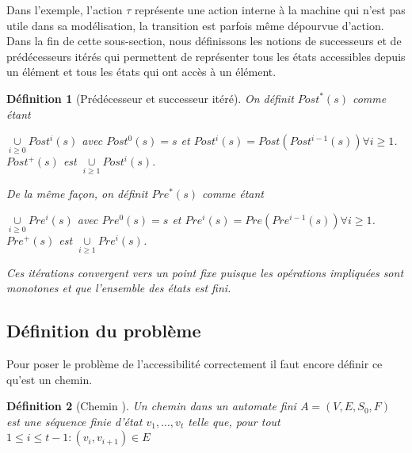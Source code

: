 \documentclass[12pt,a4paper,oneside]{book}
\theoremstyle{break}
\newtheorem{defin}{Définition}[chapter]
\theoremstyle{breakplain}
\begin{document}
Dans l'exemple, l'action $\tau$ représente une action interne à la machine qui n'est pas utile dans sa modélisation, la transition est parfois même dépourvue d'action.\\

Dans la fin de cette sous-section, nous définissons les notions de successeurs et de prédécesseurs itérés qui permettent de représenter tous les états accessibles depuis un élément et tous les états qui ont accès à un élément.


\begin{defin}[Prédécesseur et successeur itéré\cite{baier2008principles}]
On définit $Post^*(s)$ comme étant 
\begin{center}$\underset{i \geq 0}{\cup} Post^i(s)$ avec $Post^0(s) = s$ et $Post^i(s) = Post(Post^{i-1}(s)) \forall i \geq 1$.\\
$Post^+(s)$ est $\underset{i \geq 1}{\cup} Post^i(s)$.
\end{center}
De la même façon, on définit $Pre^*(s)$ comme étant
\begin{center}
$\underset{i \geq 0}{\cup} Pre^i(s)$ avec $Pre^0(s) = s$ et $Pre^i(s) = Pre(Pre^{i-1}(s)) \forall i \geq 1$.\\
$Pre^+(s)$ est $\underset{i \geq 1}{\cup} Pre^i(s)$.
\end{center}

Ces itérations convergent vers un point fixe puisque les opérations impliquées sont monotones et que l'ensemble des états est fini.
\end{defin}

\subsection{Définition du problème}
Pour poser le problème de l'accessibilité correctement il faut encore définir ce qu'est un chemin.

\begin{defin}[Chemin \cite{geeraerts2013multiprocessor}]
Un chemin dans un automate fini $A = (V, E, S_0, F)$ est une séquence finie d'état $v_1, ..., v_t$ telle que, pour tout $1 \leq i \leq t-1 : (v_i, v_{i+1}) \in E$ 
\end{defin}
\end{document}
